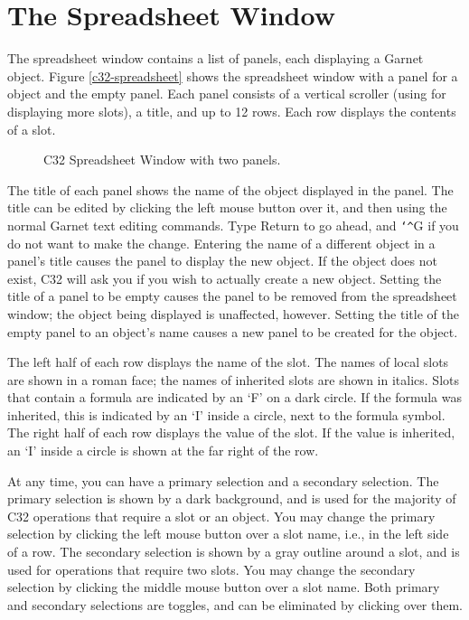 \chapter{The Spreadsheet Window}

The spreadsheet window contains a list of panels, each displaying a Garnet
object.  Figure \ref{c32-spreadsheet} shows the spreadsheet window with a
panel for a  object and the empty panel.  Each panel
consists of a vertical scroller (using for displaying more slots), a
title, and up to 12 rows.  Each row displays the contents of a slot.

\begin{figure}
\begin{center}
\end{center}
\caption{C32 Spreadsheet Window with two panels.}
\end{figure}

The title of each panel shows the name of the object displayed in the
panel.  The title can be edited by clicking the left mouse button over it,
and then using the normal Garnet text editing commands.  Type Return to go
ahead, and {\tt\char`\^}G if you do not want to make the change.  Entering the name of
a different object in a panel's title causes the panel to display the new
object.  If the object does not exist, C32 will ask you if you wish to
actually create a new object.  Setting the title of a panel to be empty
causes the panel to be removed from the spreadsheet window; the object
being displayed is unaffected, however.  Setting the title of the empty
panel to an object's name causes a new panel to be created for the object.

The left half of each row displays the name of the slot.  The names of
local slots are shown in a roman face; the names of inherited slots are
shown in italics.  Slots that contain a formula are indicated by an `F' on
a dark circle.  If the formula was inherited, this is indicated by an
`I' inside a circle, next to the formula symbol.  The right half of each
row displays the value of the slot.  If the value is inherited, an `I'
inside a circle is shown at the far right of the row.

At any time, you can have a primary selection and a secondary selection.
The primary selection is shown by a dark background, and is used for the
majority of C32 operations that require a slot or an object.  You may
change the primary selection by clicking the left mouse button over a slot
name, i.e., in the left side of a row.  The secondary selection is shown
by a gray outline around a slot, and is used for operations that require
two slots.  You may change the secondary selection by clicking the middle
mouse button over a slot name.  Both primary and secondary selections are
toggles, and can be eliminated by clicking over them.

